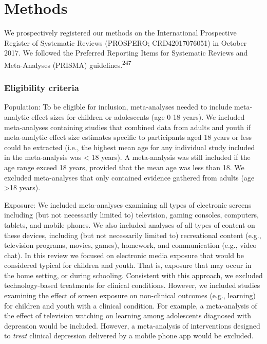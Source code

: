 \documentclass[
  english,
  man]{apa6}
\begin{document}
\hypertarget{methods}{%
\section{Methods}\label{methods}}

We prospectively registered our methods on the International Prospective Register of Systematic Reviews (PROSPERO; CRD42017076051) in October 2017.
We followed the Preferred Reporting Items for Systematic Reviews and Meta-Analyses (PRISMA) guidelines.\textsuperscript{247}

\hypertarget{eligibility-criteria}{%
\subsubsection{Eligibility criteria}\label{eligibility-criteria}}

Population:
To be eligible for inclusion, meta-analyses needed to include meta-analytic effect sizes for children or adolescents (age 0-18 years).
We included meta-analyses containing studies that combined data from adults and youth if meta-analytic effect size estimates specific to participants aged 18 years or less could be extracted (i.e., the highest mean age for any individual study included in the meta-analysis was \textless{} 18 years).
A meta-analysis was still included if the age range exceed 18 years, provided that the mean age was less than 18.
We excluded meta-analyses that only contained evidence gathered from adults (age \textgreater18 years).

Exposure:
We included meta-analyses examining all types of electronic screens including (but not necessarily limited to) television, gaming consoles, computers, tablets, and mobile phones.
We also included analyses of all types of content on these devices, including (but not necessarily limited to) recreational content (e.g., television programs, movies, games), homework, and communication (e.g., video chat).
In this review we focused on electronic media exposure that would be considered typical for children and youth.
That is, exposure that may occur in the home setting, or during schooling.
Consistent with this approach, we excluded technology-based treatments for clinical conditions.
However, we included studies examining the effect of screen exposure on non-clinical outcomes (e.g., learning) for children and youth with a clinical condition.
For example, a meta-analysis of the effect of television watching on learning among adolescents diagnosed with depression would be included.
However, a meta-analysis of interventions designed to \emph{treat} clinical depression delivered by a mobile phone app would be excluded.
\end{document}
